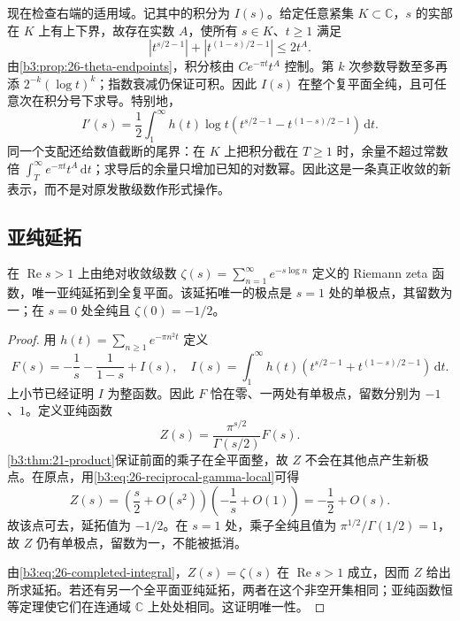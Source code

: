 \ProseParagraphBreak

现在检查右端的适用域。记其中的积分为 \(I(s)\)。给定任意紧集 \(K\subset\mathbb C\)，\(s\) 的实部在 \(K\) 上有上下界，故存在实数 \(A\)，使所有 \(s\in K\)、\(t\ge1\) 满足
\[
 \left|t^{s/2-1}\right|
 +\left|t^{(1-s)/2-1}\right|\le2t^A.
\]
由\cref{b3:prop:26-theta-endpoints}，积分核由 \(Ce^{-\pi t}t^A\) 控制。第 \(k\) 次参数导数至多再添 \(2^{-k}(\log t)^k\)；指数衰减仍保证可积。因此 \(I(s)\) 在整个复平面全纯，且可任意次在积分号下求导。特别地，
\[
 I'(s)=\frac12\int_1^\infty h(t)\log t
       \left(t^{s/2-1}-t^{(1-s)/2-1}\right)\,\mathrm dt.
\]
同一个支配还给数值截断的尾界：在 \(K\) 上把积分截在 \(T\ge1\) 时，余量不超过常数倍 \(\int_T^\infty e^{-\pi t}t^A\,\mathrm dt\)；求导后的余量只增加已知的对数幂。因此这是一条真正收敛的新表示，而不是对原发散级数作形式操作。

\subsection{亚纯延拓}
\label{b3:subsec:260303}

\begin{theorem}\label{b3:thm:26-continuation}
在 \(\operatorname{Re}s>1\) 上由绝对收敛级数
\(\zeta(s)=\sum_{n=1}^\infty e^{-s\log n}\) 定义的 Riemann zeta 函数，唯一亚纯延拓到全复平面。该延拓唯一的极点是 \(s=1\) 处的单极点，其留数为一；在 \(s=0\) 处全纯且 \(\zeta(0)=-1/2\)。
\end{theorem}
\begin{proof}
用 \(h(t)=\sum_{n\ge1}e^{-\pi n^2t}\) 定义
\[
 F(s)=-\frac1s-\frac1{1-s}+I(s),
 \quad
 I(s)=\int_1^\infty h(t)
      \left(t^{s/2-1}+t^{(1-s)/2-1}\right)\,\mathrm dt.
\]
上小节已经证明 \(I\) 为整函数。因此 \(F\) 恰在零、一两处有单极点，留数分别为 \(-1\)、\(1\)。定义亚纯函数
\[
 Z(s)=\frac{\pi^{s/2}}{\Gamma(s/2)}F(s).
\]
\cref{b3:thm:21-product}保证前面的乘子在全平面整，故 \(Z\) 不会在其他点产生新极点。在原点，用\eqref{b3:eq:26-reciprocal-gamma-local}可得
\[
 Z(s)=\left(\frac s2+O(s^2)\right)
          \left(-\frac1s+O(1)\right)
      =-\frac12+O(s).
\]
故该点可去，延拓值为 \(-1/2\)。在 \(s=1\) 处，乘子全纯且值为 \(\pi^{1/2}/\Gamma(1/2)=1\)，故 \(Z\) 仍有单极点，留数为一，不能被抵消。

由\eqref{b3:eq:26-completed-integral}，\(Z(s)=\zeta(s)\) 在 \(\operatorname{Re}s>1\) 成立，因而 \(Z\) 给出所求延拓。若还有另一个全平面亚纯延拓，两者在这个非空开集相同；亚纯函数恒等定理使它们在连通域 \(\mathbb C\) 上处处相同。这证明唯一性。
\end{proof}

